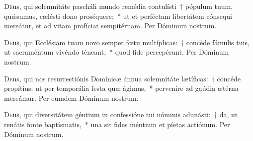\documentclass[vesperale_romanum.tex]{subfiles}
\begin{document}





\oratio

\lettrine{D}{e}us, qui sole\-mnitáte pascháli mundo remédia contulísti~† pópulum tuum, quǽsumus, cælésti dono proséquere;~* ut et perféctam libertátem cónsequi mereátur, et ad vitam profíciat sempitérnam. Per Dóminum nostrum.



\oratio

\lettrine{D}{e}us, qui Ecclésiam tuam novo semper fœtu multíplicas:~† concéde fámulis tuis, ut sacraméntum vivéndo téneant,~* quod fide percepérunt.
Per Dóminum nostrum.



\oratio

\lettrine{D}{e}us, qui nos resurrectiónis Domínicæ ánnua sole\-mnitáte lætíficas:~† concéde propítius; ut per temporália festa quæ ágimus,~* perveníre ad gaúdia ætérna mereámur.
Per eumdem Dóminum nostrum.





\oratio

\lettrine{D}{e}us, qui diversitátem géntium in confessióne tui nóminis adunásti:~† da, ut renátis fonte baptísmatis,~* una sit fides méntium et píetas actiónum.
Per Dóminum nostrum.
\end{document}
